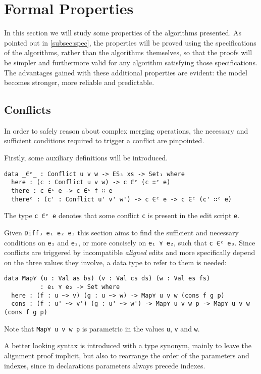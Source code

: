 \documentclass[../Thesis.tex]{subfiles}
\begin{document}
\section{Formal Properties}
\label{sec:FormalProp}
In this section we will study some properties of the algorithms presented. As pointed out in \ref{subsec:spec}, the 
properties will be proved using the specifications of the algorithms, rather
than the algorithms themselves, so that the proofs will be simpler and 
furthermore valid for any algorithm satisfying those specifications.
The advantages gained with these additional properties
are evident: the model becomes stronger, more reliable and predictable.

	\subsection{Conflicts}
	\label{subsec:conflicts}
		In order to safely reason about complex merging operations, 
		the necessary and sufficient conditions required to trigger a conflict are 
		pinpointed.

		Firstly, some auxiliary definitions will be introduced.
\begin{verbatim}
data _∈ᶜ_ : Conflict u v w -> ES₃ xs -> Set₁ where
  here : (c : Conflict u v w) -> c ∈ᶜ (c ∷ᶜ e)
  there : c ∈ᶜ e -> c ∈ᶜ f ∷ e
  thereᶜ : (c' : Conflict u' v' w') -> c ∈ᶜ e -> c ∈ᶜ (c' ∷ᶜ e)
\end{verbatim}

		The type \texttt{c ∈ᶜ e} denotes that some conflict \texttt{c}
		is present in the edit script \texttt{e}.

		Given \texttt{Diff₃ e₁ e₂ e₃} this section aims to find the sufficient and 
		necessary conditions on \texttt{e₁} and \texttt{e₂}, or more concisely
		on \texttt{e₁ ⋎ e₂}, such that \texttt{c ∈ᶜ e₃}.	
		Since conflicts are triggered by incompatible \emph{aligned} edits
		and more specifically depend on the three values they involve,
		a data type to refer to 	them is needed:
\begin{verbatim}
data Map⋎ (u : Val as bs) (v : Val cs ds) (w : Val es fs) 
          : e₁ ⋎ e₂ -> Set where
  here : (f : u ~> v) (g : u ~> w) -> Map⋎ u v w (cons f g p) 
  cons : (f : u' ~> v') (g : u' ~> w') -> Map⋎ u v w p -> Map⋎ u v w (cons f g p)
\end{verbatim}
	Note that \texttt{Map⋎ u v w p} is parametric in the values \texttt{u}, 
	\texttt{v} and \texttt{w}.
		
	A better looking syntax is introduced with a type synonym, mainly
	to leave the alignment proof implicit, but also to rearrange the order
	of the parameters and indexes, since in declarations parameters
	always precede indexes.
	
\end{document}

